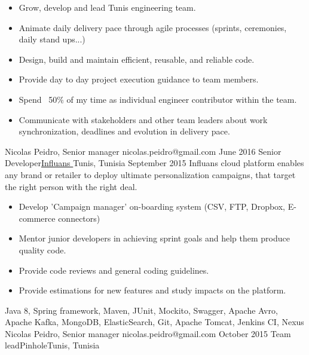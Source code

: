 \begin{experiences}
                    {
                      \begin{itemize}
                        \item Grow, develop and lead Tunis engineering team.
                        \item Animate daily delivery pace through agile processes (sprints, ceremonies, daily stand ups...)
                        \item Design, build and maintain efficient, reusable, and reliable code.
                        \item Provide day to day project execution guidance to team members.
                        \item Spend ~50\% of my time as individual engineer contributor within the team.
                        \item Communicate with stakeholders and other team leaders about work synchronization, deadlines and evolution in delivery pace.
                      \end{itemize}
                    }
                    {Nicolas Peidro, Senior manager} {nicolas.peidro@gmail.com}
  \emptySeparator   
  \experienceWithReference
    {June 2016}       {Senior Developer}{\href{https://www.influans.com}{Influans \faExternalLink}}{Tunis, Tunisia}
    {September 2015}      {Influans cloud platform enables any brand or retailer to deploy ultimate personalization campaigns, that target the right person with the right deal.}
                    {
                      \begin{itemize}
                        \item Develop 'Campaign manager' on-boarding system (CSV, FTP, Dropbox, E-commerce connectors)
                        \item Mentor junior developers in achieving sprint goals and help them produce quality code.
                        \item Provide code reviews and general coding guidelines.
                        \item Provide estimations for new features and study impacts on the platform.
                      \end{itemize}
                    }
                    {Java 8, Spring framework, Maven, JUnit, Mockito, Swagger, Apache Avro, Apache Kafka, MongoDB, ElasticSearch, Git, Apache Tomcat, Jenkins CI, Nexus}
                    {Nicolas Peidro, Senior manager} {nicolas.peidro@gmail.com}
  \emptySeparator  
  \experience
    {October 2015}   {Team lead}{Pinhole}{Tunis, Tunisia}

\end{experiences}
